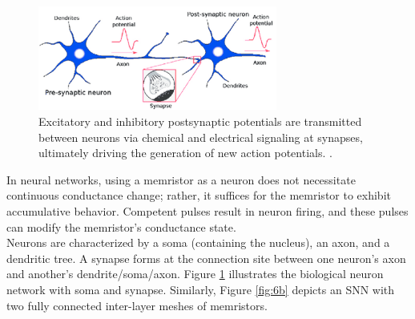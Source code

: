 
\begin{figure}[htbp!] 
    \centering    
    \includegraphics[width=0.7\textwidth]{Chapter6/Figs/a.png}
    \caption[Excitatory and inhibitory postsynaptic potentials are transmitted between neurons via chemical and electrical signaling at synapses.]{Excitatory and inhibitory postsynaptic potentials are transmitted between neurons via chemical and electrical signaling at synapses, ultimately driving the generation of new action potentials. \cite{burr2017neuromorphic}.}
    \label{fig:6a}
    \end{figure}

\noindent In neural networks, using a memristor as a neuron does not necessitate continuous conductance change; rather, it suffices for the memristor to exhibit accumulative behavior. Competent pulses result in neuron firing, and these pulses can modify the memristor's conductance state.\\


\noindent Neurons are characterized by a soma (containing the nucleus), an axon, and a dendritic tree. A synapse forms at the connection site between one neuron's axon and another's dendrite/soma/axon. Figure \ref{fig:6a} illustrates the biological neuron network with soma and synapse. Similarly, Figure \ref{fig:6b} depicts an SNN with two fully connected inter-layer meshes of memristors.\\

